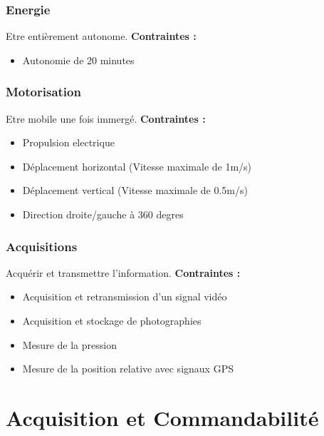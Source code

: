 \documentclass[a4paper,11pt]{report}
\begin{document}
						\subsection{Energie}
								Etre entièrement autonome. \newline
								\textbf{Contraintes :}
								\begin{itemize}
										\item Autonomie de 20 minutes
								\end{itemize}

						\subsection{Motorisation}
								Etre mobile une fois immergé. \newline
								\textbf{Contraintes :}
								\begin{itemize}
										\item Propulsion electrique
										\item Déplacement horizontal (Vitesse maximale de 1m/s)
										\item Déplacement vertical (Vitesse maximale de 0.5m/s)
										\item Direction droite/gauche à 360 degres   \newline \newline
								\end{itemize}

						\subsection{Acquisitions}
								Acquérir et transmettre l'information. \newline
								\textbf{Contraintes :}
								\begin{itemize}
										\item Acquisition et retransmission d'un signal vidéo
										\item Acquisition et stockage de photographies
										\item Mesure de la pression
										\item Mesure de la position relative avec signaux GPS
								\end{itemize}
								
\chapter{Acquisition et Commandabilité}
	
\end{document}
